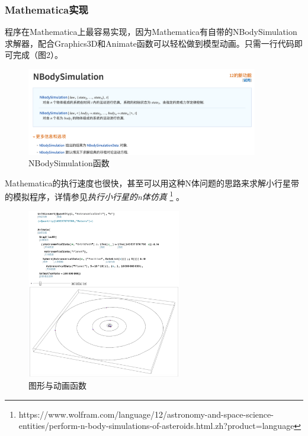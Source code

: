\documentclass{ctexart}
\theoremstyle{definition}
\begin{document}
        \subsubsection{Mathematica实现}
            程序在Mathematica上最容易实现，因为Mathematica有自带的NBodySimulation求解器，配合Graphics3D和Animate函数可以轻松做到模型动画。只需一行代码即可完成（图2）。
            \begin{figure}[h]
                \centering
                \includegraphics[width=0.9\textwidth]{mathematica_2.png}
                \caption{\label{fig:mathematica_2}NBodySimulation函数}
            \end{figure}
            
            Mathematica的执行速度也很快，甚至可以用这种N体问题的思路来求解小行星带的模拟程序，详情参见\textit{执行小行星的n体仿真} \footnote{https://www.wolfram.com/language/12/astronomy-and-space-science-entities/perform-n-body-simulations-of-asteroids.html.zh?product=language} 。
            
        \clearpage
            
        \begin{figure}[h]
                \centering
                \includegraphics[width=0.60\textwidth]{mathematica_1.png}
                \caption{\label{fig:mathematica_1}图形与动画函数}
        \end{figure}
        
\end{document}
